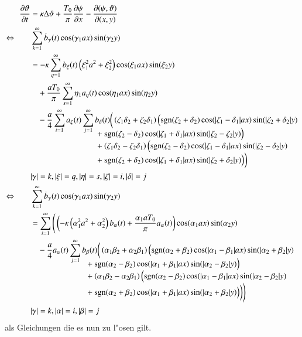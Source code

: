 \begin{align*}
\frac{\partial\vartheta}{\partial t}
&=
\kappa\Delta\vartheta
+ \frac{T_0}{\pi}\frac{\partial\psi}{\partial x}
- \frac{\partial(\psi,\vartheta)}{\partial(x,y)}
\\
\Leftrightarrow \qquad
&
\sum_{k = 1}^{\infty}
\dot{b}_{\gamma}(t)
\cos(\gamma_1 ax) \sin(\gamma_2 y)
\\
&=
-
\kappa
\sum_{q = 1}^{\infty}
b_{\xi}(t)
\left(\xi_1^2 a^2 + \xi_2^2\right)
\cos(\xi_1 ax) \sin(\xi_2 y)
\\
&\phantom{={}}
+
\frac{a T_0}{\pi}
\sum_{s = 1}^{\infty}
\eta_1
a_{\eta}(t)
\cos(\eta_1 ax) \sin(\eta_2 y)
\\
&\phantom{={}}
-
\frac{a}{4}
\sum_{i = 1}^{\infty}
a_{\zeta}(t)
\sum_{j = 1}^{\infty}
b_{\delta}(t)
\bigg(
\left(\zeta_1 \delta_2 + \zeta_2 \delta_1 \right)
\Big(
\sgn(\zeta_2 + \delta_2)
\cos(|\zeta_1 - \delta_1|ax)\sin(|\zeta_2 + \delta_2|y)
\\[-2.5ex]
&\phantom{=-abbb\sum\sum.....{}}
+
\sgn(\zeta_2 - \delta_2)
\cos(|\zeta_1 + \delta_1|ax)\sin(|\zeta_2 - \zeta_2|y)
\Big)
\\[-1.0ex]
&\phantom{=-abbb\sum\sum.....{}}
+
\left(\zeta_1 \delta_2 - \zeta_2 \delta_1 \right)
\Big(
\sgn(\zeta_2 - \delta_2)
\cos(|\zeta_1 - \delta_1|ax)\sin(|\zeta_2 - \delta_2|y)
\\[-1.0ex]
&\phantom{=-abbb\sum\sum.....{}}
+
\sgn(\zeta_2 + \delta_2)
\cos(|\zeta_1 + \delta_1|ax)\sin(|\zeta_2 + \delta_2|y)
\Big)
\bigg)
\\
&|\gamma| = k, |\xi| = q, |\eta| = s, |\zeta| = i, |\delta| = j
\\
\Leftrightarrow \qquad
&\sum_{k = 1}^{\infty}
\dot{b}_{\gamma}(t)
\cos(\gamma_1 ax) \sin(\gamma_2 y)
\\
&=
\sum_{i = 1}^{\infty}
\Bigg(
\left(
-
\kappa
\left(\alpha_1^2 a^2 + \alpha_2^2\right)
b_{\alpha}(t)
+
\frac{\alpha_1 a T_0}{\pi}
a_{\alpha}(t)
\right)
\cos(\alpha_1 ax) \sin(\alpha_2 y)
\\
&\phantom{={}}
-
\frac{a}{4}
a_{\alpha}(t)
\sum_{j = 1}^{\infty}
b_{\beta}(t)
\bigg(
\left(\alpha_1 \beta_2 + \alpha_2 \beta_1 \right)
\Big(
\sgn(\alpha_2 + \beta_2)
\cos(|\alpha_1 - \beta_1|ax)\sin(|\alpha_2 + \beta_2|y)
\\[-2.5ex]
&\phantom{=-aat\sum\sum...{}}
+
\sgn(\alpha_2 - \beta_2)
\cos(|\alpha_1 + \beta_1|ax)\sin(|\alpha_2 - \beta_2|y)
\Big)
\\[-1.0ex]
&\phantom{=-aat\sum\sum...{}}
+
\left(\alpha_1 \beta_2 - \alpha_2 \beta_1 \right)
\Big(
\sgn(\alpha_2 - \beta_2)
\cos(|\alpha_1 - \beta_1|ax)\sin(|\alpha_2 - \beta_2|y)
\\[-1.0ex]
&\phantom{=-aat\sum\sum...{}}
+
\sgn(\alpha_2 + \beta_2)
\cos(|\alpha_1 + \beta_1|ax)\sin(|\alpha_2 + \beta_2|y)
\Big)
\bigg)
\Bigg)
\\
&|\gamma| = k, |\alpha| = i, |\beta| = j
\end{align*}
als Gleichungen die es nun zu l"osen gilt.

